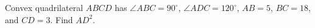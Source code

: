 Convex quadrilateral $ABCD$ has $\angle ABC=90^\circ$, $\angle ADC=120^\circ$, $AB=5$, $BC=18$, and $CD=3$. Find $AD^2$.
